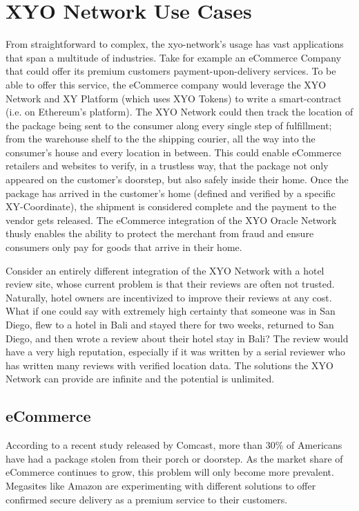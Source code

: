 \documentclass{article}
\begin{document}
\section{XYO Network Use Cases}
From straightforward to complex, the \Gls{xyo-network}'s usage  has vast applications that span a multitude of industries. Take for example an eCommerce Company that could offer its premium customers payment-upon-delivery services. To be able to offer this service, the eCommerce company would leverage the XYO Network and XY Platform (which uses XYO Tokens) to write a \gls{smart-contract} (i.e. on Ethereum's platform). The XYO Network could then track the location of the package being sent to the consumer along every single step of fulfillment; from the warehouse shelf to the the shipping courier, all the way into the consumer's house and every location in between. This could enable eCommerce retailers and websites to verify, in a trustless way, that the package not only appeared on the customer's doorstep, but also safely inside their home. Once the package has arrived in the customer's home (defined and verified by a specific XY-Coordinate), the shipment is considered complete and the payment to the vendor gets released. The eCommerce integration of the XYO Oracle Network thusly enables the ability to protect the merchant from fraud and ensure consumers only pay for goods that arrive in their home.

Consider an entirely different integration of the XYO Network with a hotel review site, whose current problem is that their reviews are often not trusted. Naturally, hotel owners are incentivized to improve their reviews at any cost. What if one could say with extremely high \gls{certainty} that someone was in San Diego, flew to a hotel in Bali and stayed there for two weeks, returned to San Diego, and then wrote a review about their hotel stay in Bali? The review would have a very high reputation, especially if it was written by a serial reviewer who has written many reviews with verified location data. The solutions the XYO Network can provide are infinite and the potential is unlimited.

\subsection{eCommerce}
According to a recent study released by Comcast, more than 30\% of Americans have had a package stolen from their porch or doorstep. As the market share of eCommerce continues to grow, this problem will only become more prevalent. Megasites like Amazon are experimenting with different solutions to offer confirmed secure delivery as a premium service to their customers.
\end{document}
